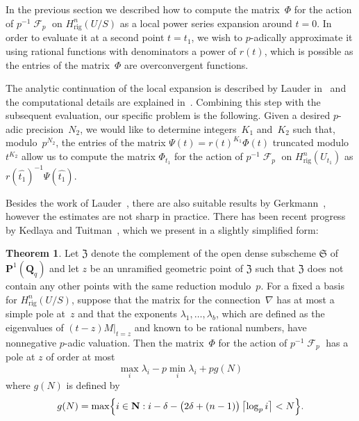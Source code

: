 \documentclass[a4paper,11pt]{article}
\numberwithin{equation}{section}
\providecommand{\ceil}[1]{\left\lceil#1\right\rceil}   %
\DeclareMathOperator{\Frob}{\mathcal{F}} %
\providecommand{\Hrig}{H_{\text{rig}}}  %
\theoremstyle{definition}
\newtheorem{thm}{Theorem}[section]
\begin{document}
In the previous section we described how to compute the matrix~$\Phi$ 
for the action of $p^{-1} \Frob_p$ on $\Hrig^{n}(U/S)$ 
as a local power series expansion around $t = 0$.  In order to evaluate it 
at a second point $t = t_1$, we wish to $p$-adically approximate it 
using rational functions with denominators a power of $r(t)$, which 
is possible as the entries of the matrix~$\Phi$ are overconvergent 
functions.

The analytic continuation of the local expansion is described by Lauder 
in~\citep[\S 5.2]{Lauder2006} and the computational details are explained 
in~\citep[\S 8.1]{Lauder2004a}.  Combining this step with the subsequent 
evaluation, our specific problem is the following.  Given a desired 
$p$-adic precision~$N_2$, we would like to determine integers~$K_1$ 
and~$K_2$ such that, modulo~$p^{N_2}$, the entries of the matrix 
$\Psi(t) = r(t)^{K_1} \Phi(t)$ truncated modulo~$t^{K_2}$ allow us to 
compute the matrix $\Phi_{t_1}$ for the action of $p^{-1} \Frob_p$ 
on $\Hrig^{n}(U_{t_1})$ as $r(\hat{t_1})^{-1} \Psi(\hat{t_1})$.

Besides the work of Lauder~\citep[\S 8.1]{Lauder2004a}, there are also 
suitable results by Gerkmann~\citep[\S 6]{Gerkmann2007}, however the 
estimates are not sharp in practice.  There has been recent progress by 
Kedlaya and Tuitman~\citep[Theorem~2.1]{KedlayaTuitman2012}, which we 
present in a slightly simplified form:

\begin{thm} \label{thm:KedlayaTuitman}
Let $\mathfrak{Z}$ denote the complement of the open dense 
subscheme $\mathfrak{S}$ of $\mathbf{P}^{1}(\mathbf{Q}_q)$ 
and let $z$ be an unramified geometric point of $\mathfrak{Z}$ 
such that $\mathfrak{Z}$ does not contain any other points 
with the same reduction modulo~$p$.  For a fixed a basis for 
$\Hrig^n(U/S)$, suppose that the matrix 
for the connection~$\nabla$ has at most a simple pole at~$z$ 
and that the exponents $\lambda_1, \dotsc, \lambda_{b}$, 
which are defined as the eigenvalues of $(t - z) M \vert_{t=z}$ 
and known to be rational numbers, have nonnegative $p$-adic 
valuation.  Then the matrix~$\Phi$ for the action of $p^{-1} \Frob_p$ 
has a pole at $z$ of order at most 
\begin{equation} \label{eq:KedlayaTuitman}
\max_{i} \lambda_i - p \min_{i} \lambda_i + p g(N)
\end{equation}
where $g(N)$ is defined by 
\begin{equation}
g(N) = \max\Bigl\{ i \in \mathbf{N} : i - \delta - \bigl(2\delta + (n-1)\bigr) \ceil{\log_p i} < N \Bigr\}.
\end{equation}
\end{thm}
\end{document}
